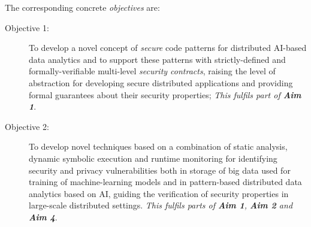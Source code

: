 \documentclass[a4paper,11pt]{article}
\begin{document}
The corresponding concrete \emph{objectives} are: 
\begin{description}

 
\item[Objective 1:] To develop a novel concept of \emph{secure} code patterns for distributed AI-based data analytics and to support these
patterns with strictly-defined and formally-verifiable multi-level \emph{security contracts}, raising the level of abstraction
for developing secure distributed applications and providing formal guarantees about their security properties; 
\emph{This fulfils part of \textbf{Aim 1}}. 

\item[Objective 2:] To develop novel techniques based on a combination of static analysis, dynamic symbolic execution and runtime monitoring for identifying security and privacy vulnerabilities both in storage of big data used for training of machine-learning models and in pattern-based distributed data analytics based on AI, guiding the verification of security properties in large-scale distributed settings. \emph{This fulfils parts of \textbf{Aim 1}, \textbf{Aim 2} and \textbf{Aim 4}}.
  

\end{description}
\end{document}

